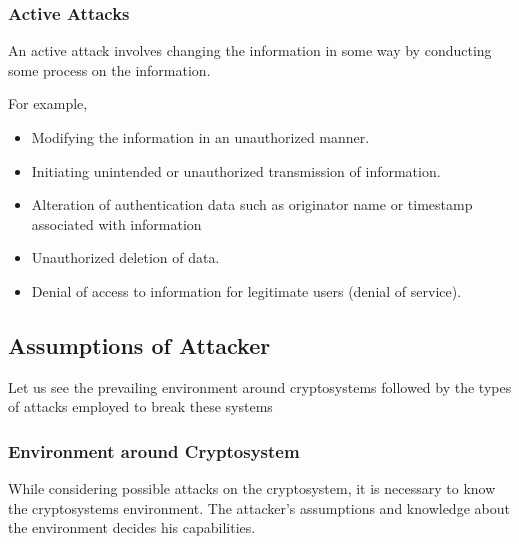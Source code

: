 \documentclass[british]{article}
\begin{document}
\subsubsection{Active Attacks}

An active attack involves changing the information in some way by
conducting some process on the information.

For example,
\begin{itemize}
\item Modifying the information in an unauthorized manner.
\item Initiating unintended or unauthorized transmission of information.
\item Alteration of authentication data such as originator name or timestamp
associated with information
\item Unauthorized deletion of data.
\item Denial of access to information for legitimate users (denial of service).
\end{itemize}

\subsection{Assumptions of Attacker}

Let us see the prevailing environment around cryptosystems followed
by the types of attacks employed to break these systems \textminus{}

\subsubsection{Environment around Cryptosystem}

While considering possible attacks on the cryptosystem, it is necessary
to know the cryptosystems environment. The attacker\textquoteright s
assumptions and knowledge about the environment decides his capabilities.
\end{document}
